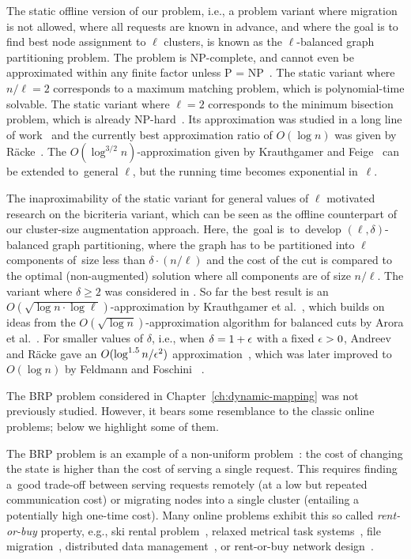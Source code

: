 The static offline version of our problem, i.e., a problem variant where
migration is not allowed, where all requests are known in advance, and where
the goal is to find best node assignment to $\ell$ clusters, is known as the
$\ell$-balanced graph partitioning problem. The problem is 
NP-complete, and cannot even be approximated within any finite factor unless P
= NP~\cite{AndRae06}. The static variant where $n/\ell = 2$ corresponds to a
maximum matching problem, which is polynomial-time solvable. The static
variant where $\ell = 2$ corresponds to the minimum bisection problem, which
is already NP-hard~\cite{GaJoSt76}. Its approximation was studied in a long
line of work~\cite{SarVaz95,ArKaKa99,FeKrNi00,FeiKra02,KraFei06,Raec08} and
the currently best approximation ratio of $O(\log n)$ was given by
R{\"{a}}cke~\cite{Raec08}. The $O(\log^{3/2} n)$-approximation given by
Krauthgamer and Feige~\cite{KraFei06} can be extended to~general $\ell$, but
the running time becomes exponential in~$\ell$.

The inaproximability of the static variant for general values of $\ell$
motivated research on the bicriteria variant, which can be seen as the offline
counterpart of our cluster-size augmentation approach. Here, the~goal
is~to~develop $(\ell,\delta)$-balanced graph partitioning, where the graph has
to be partitioned into $\ell$ components of~size less than $\delta \cdot (n /
\ell)$ and the cost of the cut is compared to the optimal (non-augmented)
solution where all components are of size $n / \ell$. The variant where
$\delta \geq 2$ was considered in
\cite{LeMaTr90,SimTen97,EvNaRS00,EvNaRS99,KrNaSc09}. So far the best result is
an $O(\!\sqrt{\log n \cdot \log \ell})$-approximation by Krauthgamer et
al.~\cite{KrNaSc09}, which builds on ideas from the $O(\!\sqrt{\log
n})$-approximation algorithm for balanced cuts by Arora et al.~\cite{ArRaVa09}.
For smaller values of $\delta$, i.e., when $\delta = 1 + \epsilon$ with a fixed
$\epsilon > 0$, Andreev and R{\"{a}}cke gave an $O(\log^{1.5} n / \epsilon^2)$
approximation~\cite{AndRae06}, which was later improved to $O(\log n)$ by
Feldmann and Foschini ~\cite{FelFos15}.

The BRP problem considered in Chapter~\ref{ch:dynamic-mapping} was not previously studied. However,
it bears some resemblance to the classic online problems; below we highlight
some of them.

The BRP problem is an example of a non-uniform problem~\cite{KaMaMO94}: the
cost of changing the state is higher than the cost of serving a single
request. This requires finding a~good trade-off between serving requests
remotely (at a low but repeated communication cost) or migrating nodes into a
single cluster (entailing a potentially high one-time cost). Many
online problems exhibit this so called \emph{rent-or-buy} property, e.g., ski
rental problem~\cite{KaMaMO94,LoPaRa08}, relaxed metrical task
systems~\cite{BaChIn01}, file migration~\cite{BaChIn01,BiByMu17}, distributed
data management~\cite{BaFiRa95,AwBaFi93,AwBaFi98}, or rent-or-buy network
design~\cite{AwAzBa04,Umboh15,FeWiLe16}.

